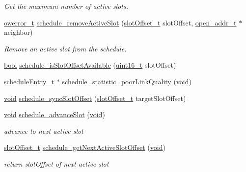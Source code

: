 \begin{DoxyCompactItemize}
\begin{DoxyCompactList}\small\item\em Get the maximum number of active slots. \end{DoxyCompactList}\item 
\hyperlink{opendefs_8h_af20b7c3ed9d2ba19e56a309ad9314803}{owerror\+\_\+t} \hyperlink{group___schedule_ga6565eddf152a1e9df7bbbbdcf8da87ad}{schedule\+\_\+remove\+Active\+Slot} (\hyperlink{group___schedule_ga30a663860a70d8c9db2c3a8e66f544fc}{slot\+Offset\+\_\+t} slot\+Offset, \hyperlink{structopen__addr__t}{open\+\_\+addr\+\_\+t} $\ast$neighbor)
\begin{DoxyCompactList}\small\item\em Remove an active slot from the schedule. \end{DoxyCompactList}\item 
\hyperlink{_p_e___types_8h_a97a80ca1602ebf2303258971a2c938e2}{bool} \hyperlink{group___schedule_ga08f2bf7e2661dddfa4eb18f80cdad000}{schedule\+\_\+is\+Slot\+Offset\+Available} (\hyperlink{_p_e___types_8h_a1f1825b69244eb3ad2c7165ddc99c956}{uint16\+\_\+t} slot\+Offset)
\item 
\hyperlink{structschedule_entry__t}{schedule\+Entry\+\_\+t} $\ast$ \hyperlink{group___schedule_gaa341503b0e4ebafeaff9ab5de94be13f}{schedule\+\_\+statistic\+\_\+poor\+Link\+Quality} (\hyperlink{usb__devapi_8h_afabf60e7f57651d6d595a02c75f07cd0}{void})
\item 
\hyperlink{usb__devapi_8h_afabf60e7f57651d6d595a02c75f07cd0}{void} \hyperlink{group___schedule_gaf44e496db5d623ea8168d0eaeffc8b2d}{schedule\+\_\+sync\+Slot\+Offset} (\hyperlink{group___schedule_ga30a663860a70d8c9db2c3a8e66f544fc}{slot\+Offset\+\_\+t} target\+Slot\+Offset)
\item 
\hyperlink{usb__devapi_8h_afabf60e7f57651d6d595a02c75f07cd0}{void} \hyperlink{group___schedule_gae6998948df91f1ef9124bec27dc87c2e}{schedule\+\_\+advance\+Slot} (\hyperlink{usb__devapi_8h_afabf60e7f57651d6d595a02c75f07cd0}{void})
\begin{DoxyCompactList}\small\item\em advance to next active slot \end{DoxyCompactList}\item 
\hyperlink{group___schedule_ga30a663860a70d8c9db2c3a8e66f544fc}{slot\+Offset\+\_\+t} \hyperlink{group___schedule_ga01252633416fb574b1277b1303030248}{schedule\+\_\+get\+Next\+Active\+Slot\+Offset} (\hyperlink{usb__devapi_8h_afabf60e7f57651d6d595a02c75f07cd0}{void})
\begin{DoxyCompactList}\small\item\em return slot\+Offset of next active slot \end{DoxyCompactList}\item 

\end{DoxyCompactItemize}
